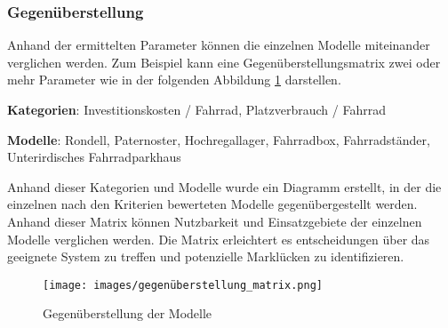 \subsubsection{Gegenüberstellung}

Anhand der ermittelten Parameter können die einzelnen Modelle miteinander verglichen werden. Zum Beispiel kann eine Gegenüberstellungsmatrix zwei oder mehr Parameter wie in der folgenden Abbildung \ref{fig:gegenueberstellung} darstellen.

\medskip

\textbf{Kategorien}: Investitionskosten / Fahrrad, Platzverbrauch / Fahrrad

\indent
\textbf{Modelle}: Rondell, Paternoster, Hochregallager, Fahrradbox, Fahrradständer, Unterirdisches Fahrradparkhaus

\medskip

\noindent Anhand dieser Kategorien und Modelle wurde ein Diagramm erstellt, in der die einzelnen nach den Kriterien bewerteten Modelle gegenübergestellt werden. Anhand dieser Matrix können Nutzbarkeit und Einsatzgebiete der einzelnen Modelle verglichen werden. Die Matrix erleichtert es entscheidungen über das geeignete System zu treffen und potenzielle Marklücken zu identifizieren.

\begin{figure}[H]
  \centering
  \texttt{[image: images/gegenüberstellung\_matrix.png]}
  \caption{Gegenüberstellung der Modelle}
  \label{fig:gegenueberstellung}
\end{figure}